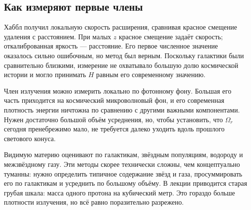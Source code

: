 \subsection{Как измеряют первые члены}

Хаббл получил локальную скорость расширения, сравнивая красное смещение удаления с расстоянием. При малых \(z\) красное смещение задаёт скорость; откалиброванная яркость — расстояние. Его первое численное значение оказалось сильно ошибочным, но метод был верным. Поскольку галактики были сравнительно близкими, измерение не охватывало большую долю космической истории и могло принимать \(H\) равным его современному значению.

\begin{classroomqa}
\end{classroomqa}

\begin{classroomqa}
\end{classroomqa}

Член излучения можно измерить локально по фотонному фону. Большая его часть приходится на космический микроволновый фон, и его современная плотность энергии ничтожна по сравнению с другими важными компонентами. Нужен достаточно большой объём усреднения, но, чтобы установить, что \(\Omega_r\) сегодня пренебрежимо мало, не требуется далеко уходить вдоль прошлого светового конуса.

Видимую материю оценивают по галактикам, звёздным популяциям, водороду и межзвёздному газу. Эти методы скорее технически сложны, чем концептуально туманны: нужно определить типичное содержание звёзд и газа, просуммировать его по галактикам и усреднить по большому объёму. В лекции приводится старая грубая шкала: масса одного протона на кубический метр. Это гораздо больше плотности излучения, но всё равно поразительно разрежено.

